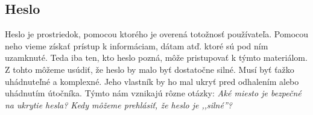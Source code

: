  
\subsection{Heslo}
Heslo je prostriedok, pomocou ktorého je overená totožnosť používateľa. \cite{1} Pomocou neho vieme získať prístup k informáciam, dátam atď. ktoré sú pod ním uzamknuté. Teda iba ten, kto heslo pozná, môže pristupovať k týmto materiálom. Z tohto môžeme usúdiť, že heslo by malo byť dostatočne silné. Musí byť ťažko uhádnuteľné a komplexné. Jeho vlastník by ho mal ukryť pred odhalením alebo uhádnutím útočníka. Týmto nám vznikajú rôzne otázky: \textit{Aké miesto je bezpečné na ukrytie hesla? Kedy môžeme prehlásiť, že heslo je ,,silné''?}
